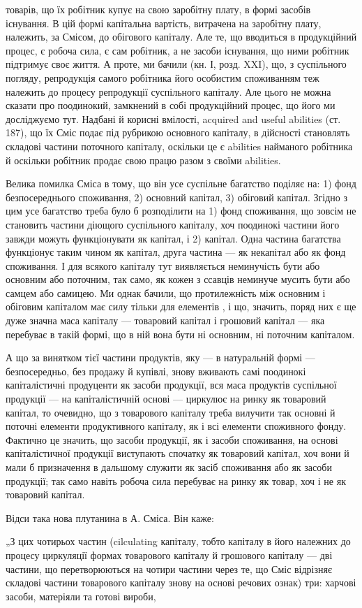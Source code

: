\parcont{}  %
товарів, що їх робітник купує на свою заробітну плату, в формі засобів
існування. В цій формі капітальна вартість, витрачена на заробітну плату,
належить, за Смісом, до обігового капіталу. Але те, що вводиться в
продукційний процес, є робоча сила, є сам робітник, а не засоби існування,
що ними робітник підтримує своє життя. А проте, ми бачили
(кн. І, розд. XXI), що, з суспільного погляду, репродукція самого робітника
його особистим споживанням теж належить до процесу репродукції
суспільного капіталу. Але цього не можна сказати про поодинокий,
замкнений в собі продукційний процес, що його ми досліджуємо тут.
Надбані й корисні вмілості, acquired and useful abilities (ст. 187), що їх
Сміс подає під рубрикою основного капіталу, в дійсності становлять
складові частини поточного капіталу, оскільки це є abilities найманого
робітника й оскільки робітник продає свою працю разом з своїми abilities.

Велика помилка Сміса в тому, що він усе суспільне багатство поділяє
на: 1) фонд безпосереднього споживання, 2) основний капітал,
3) обіговий капітал. Згідно з цим усе багатство треба було б розподілити
на 1) фонд споживання, що зовсім не становить частини діющого
суспільного капіталу, хоч поодинокі частини його завжди можуть функціонувати
як капітал, і 2) капітал. Одна частина багатства функціонує
таким чином як капітал, друга частина — як некапітал або як фонд
споживання. І для всякого капіталу тут виявляється неминучість бути
або основним або поточним, так само, як кожен з ссавців неминуче мусить
бути або самцем або самицею. Ми однак бачили, що протилежність
між основним і обіговим капіталом має силу тільки для елементів , і що, значить, поряд них є ще дуже значна
маса капіталу — товаровий капітал і грошовий капітал — яка перебуває в
такій формі, що в ній  вона бути ні основним, ні поточним
капіталом.

А що за винятком тієї частини продуктів, яку — в натуральній формі —
безпосередньо, без продажу й купівлі, знову вживають самі поодинокі
капіталістичні продуценти як засоби продукції, вся маса продуктів суспільної
продукції — на капіталістичній основі — циркулює на ринку як
товаровий капітал, то очевидно, що з товарового капіталу треба вилучити
так основні й поточні елементи продуктивного капіталу, як і всі
елементи споживного фонду. Фактично це значить, що засоби продукції,
як і засоби споживання, на основі капіталістичної продукції виступають
спочатку як товаровий капітал, хоч вони й мали б призначення в
дальшому служити як засіб споживання або як засоби продукції; так само
навіть робоча сила перебуває на ринку як товар, хоч і не як товаровий
капітал.

Відси така нова плутанина в А. Сміса. Він каже:

„З цих чотирьох частин (cilculating капіталу, тобто капіталу в його
належних до процесу циркуляції формах товарового капіталу й грошового
капіталу — дві частини, що перетворюються на чотири частини через
те, що Сміс відрізняє складові частини товарового капіталу знову на
основі речових ознак) три: харчові засоби, матеріяли та готові вироби,
\parbreak{}  %

